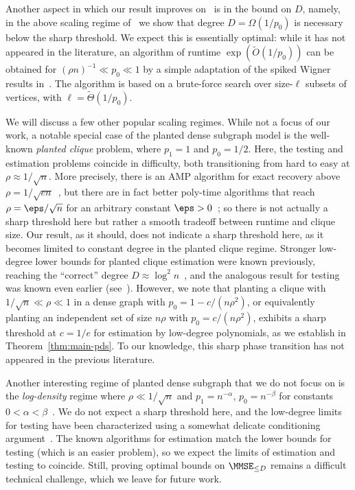 \documentclass[11pt]{article}
\begin{document}
Another aspect in which our result improves on~\cite{SW-estimation} is in the bound on $D$, namely, in the above scaling regime of~\cite{HWX-reduction} we show that degree $D = \Omega(1/p_0)$ is necessary below the sharp threshold. We expect this is essentially optimal: while it has not appeared in the literature, an algorithm of runtime $\exp(\tilde{O}(1/p_0))$ can be obtained for $(\rho n)^{-1} \ll p_0 \ll 1$ by a simple adaptation of the spiked Wigner results in~\cite{subexp-sparse}. The algorithm is based on a brute-force search over size-$\ell$ subsets of vertices, with $\ell = \tilde\Theta(1/p_0)$.

We will discuss a few other popular scaling regimes. While not a focus of our work, a notable special case of the planted dense subgraph model is the well-known \emph{planted clique} problem, where $p_1 = 1$ and $p_0 = 1/2$. Here, the testing and estimation problems coincide in difficulty, both transitioning from hard to easy at $\rho \approx 1/\sqrt{n}$. More precisely, there is an AMP algorithm for exact recovery above $\rho = 1/\sqrt{en}$~\cite{clique-e}, but there are in fact better poly-time algorithms that reach $\rho = \eps/\sqrt{n}$ for an arbitrary constant $\eps > 0$~\cite{alon-clique}; so there is not actually a sharp threshold here but rather a smooth tradeoff between runtime and clique size. Our result, as it should, does not indicate a sharp threshold here, as it becomes limited to constant degree in the planted clique regime. Stronger low-degree lower bounds for planted clique estimation were known previously, reaching the ``correct'' degree $D \approx \log^2 n$~\cite{SW-estimation}, and the analogous result for testing was known even earlier (see~\cite{hopkins-thesis}). However, we note that planting a clique with $1/\sqrt{n}\ll \rho\ll 1$ in a dense graph with $p_0=1-c/(n\rho^2)$, or equivalently planting an independent set of size $n\rho$ with $p_0=c/(n\rho^2)$, exhibits a sharp threshold at $c=1/e$ for estimation by low-degree polynomials, as we establish in Theorem~\ref{thm:main-pds}. To our knowledge, this sharp phase transition has not appeared in the previous literature.

Another interesting regime of planted dense subgraph that we do not focus on is the \emph{log-density} regime where $\rho \ll 1/\sqrt{n}$ and $p_1 = n^{-\alpha}$, $p_0 = n^{-\beta}$ for constants $0 < \alpha < \beta$~\cite{log-density}. We do not expect a sharp threshold here, and the low-degree limits for testing have been characterized using a somewhat delicate conditioning argument~\cite{subhyper}. The known algorithms for estimation match the lower bounds for testing (which is an easier problem), so we expect the limits of estimation and testing to coincide. Still, proving optimal bounds on $\MMSE_{\le D}$ remains a difficult technical challenge, which we leave for future work.
\end{document}
